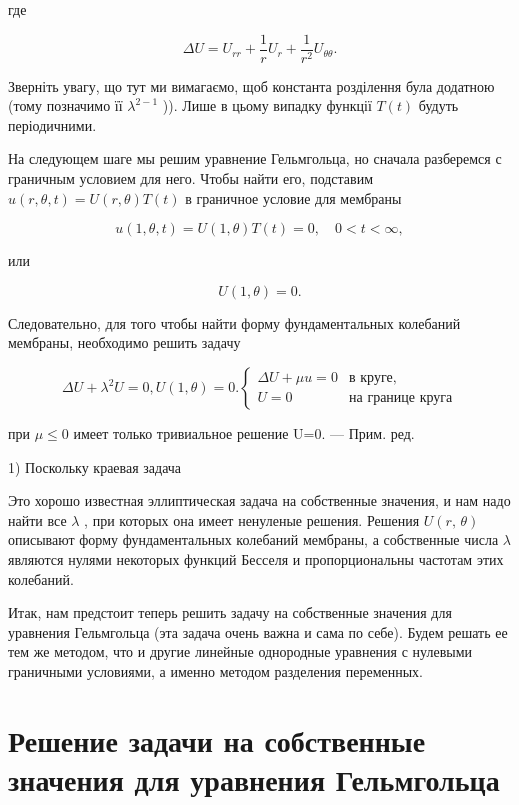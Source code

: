 \documentclass[
  ukrainian,
]{article}
\begin{document}
где

\[
\Delta U = U_{rr} + \frac{1}{r} U_r + \frac{1}{r^2} U_{\theta\theta}.
\]

Зверніть увагу, що тут ми вимагаємо, щоб константа розділення була
додатною (тому позначимо її \(\lambda^{2-1}\) )). Лише в цьому випадку
функції \(T(t)\) будуть періодичними.

На следующем шаге мы решим уравнение Гельмгольца, но сначала разберемся
с граничным условием для него. Чтобы найти его, подставим
\(u(r, \theta, t) = U(r, \theta) T(t)\) в граничное условие для мембраны

\[
u(1, \theta, t) = U(1, \theta) T(t) = 0, \quad 0 < t < \infty,
\]

или

\[
U(1, \theta) = 0.
\]

Следовательно, для того чтобы найти форму фундаментальных колебаний
мембраны, необходимо решить задачу

\[
\Delta U + \lambda^2 U = 0,
U(1, \theta) = 0.
\begin{cases} \Delta U + \mu u = 0 & \text{в круге,} \\ U = 0 & \text{на границе круга} \end{cases}
\]

при \(\mu \le 0\) имеет только тривиальное решение U=0. --- Прим. ред.

1) Поскольку краевая задача

Это хорошо известная эллиптическая задача на собственные значения, и нам
надо найти все \(\lambda\) , при которых она имеет ненуленые решения.
Решения \(U\left(r,\,\theta\right)\) описывают форму фундаментальных
колебаний мембраны, а собственные числа \(\lambda\) являются нулями
некоторых функций Бесселя и пропорциональны частотам этих колебаний.

Итак, нам предстоит теперь решить задачу на собственные значения для
уравнения Гельмгольца (эта задача очень важна и сама по себе). Будем
решать ее тем же методом, что и другие линейные однородные уравнения с
нулевыми граничными условиями, а именно методом разделения переменных.

\section{Решение задачи на собственные значения для уравнения
Гельмгольца}\label{ux440ux435ux448ux435ux43dux438ux435-ux437ux430ux434ux430ux447ux438-ux43dux430-ux441ux43eux431ux441ux442ux432ux435ux43dux43dux44bux435-ux437ux43dux430ux447ux435ux43dux438ux44f-ux434ux43bux44f-ux443ux440ux430ux432ux43dux435ux43dux438ux44f-ux433ux435ux43bux44cux43cux433ux43eux43bux44cux446ux430}
\end{document}
